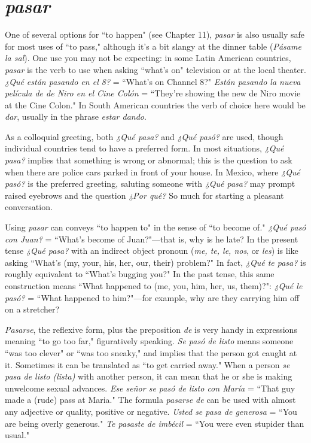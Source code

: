 \section{\emph{pasar}}

One of several options for ``to happen" (see Chapter 11), \emph{pasar}
is also usually safe for most uses of ``to pass," although it's a bit slangy
at the dinner table (\emph{Pásame la sal}). One use you may not be expecting:
in some Latin American countries, \emph{pasar} is the verb to use when asking ``what's on" television or at the local theater. \emph{¿Qué están pasando
en el 8?} = ``What's on Channel 8?" \emph{Están pasando la nueva película
de de Niro en el Cine Colón} = ``They're showing the new de Niro
movie at the Cine Colon." In South American countries the verb of
choice here would be \emph{dar}, usually in the phrase \emph{estar dando}.

As a colloquial greeting, both \emph{¿Qué pasa?} and \emph{¿Qué pasó?} are
used, though individual countries tend to have a preferred form. In
most situations, \emph{¿Qué pasa?} implies that something is wrong or abnormal; this is the question to ask when there are police cars parked in
front of your house. In Mexico, where \emph{¿Qué pasó?} is the preferred
greeting, saluting someone with \emph{¿Qué pasa?} may prompt raised eyebrows and the question \emph{¿Por qué?} So much for starting a pleasant
conversation.

Using \emph{pasar} can conveys ``to happen to" in the sense of ``to
become of." \emph{¿Qué pasó con Juan?} = ``What's become of Juan?"---that
is, why is he late? In the present tense \emph{¿Qué pasa?} with an indirect
object pronoun (\emph{me, te, le, nos}, or \emph{les}) is like asking ``What's (my, your,
his, her, our, their) problem?" In fact, \emph{¿Qué te pasa?} is roughly equivalent to ``What's bugging you?" In the past tense, this same construction means ``What happened to (me, you, him, her, us, them)?": \emph{¿Qué
le pasó?} = ``What happened to him?"---for example, why are they carrying him off on a stretcher?

\emph{Pasarse}, the reflexive form, plus the preposition \emph{de} is very
handy in expressions meaning ``to go too far," figuratively speaking. \emph{Se
pasó de listo} means someone ``was too clever" or ``was too sneaky,"
and implies that the person got caught at it. Sometimes it can be translated as ``to get carried away." When a person \emph{se pasa de listo (lista)}
with another person, it can mean that he or she is making unwelcome
sexual advances. \emph{Ese señor se pasó de listo con María} = ``That guy
made a (rude) pass at Maria." The formula \emph{pasarse de} can be used with
almost any adjective or quality, positive or negative. \emph{Usted se pasa de
generosa} = ``You are being overly generous." \emph{Te pasaste de imbécil} =
``You were even stupider than usual."

